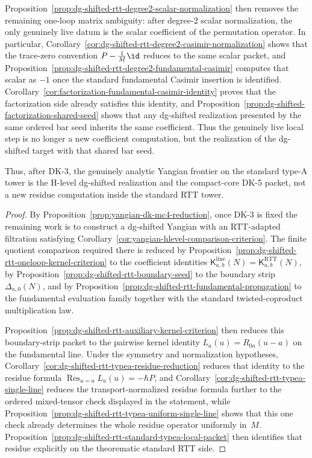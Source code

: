 \begin{proposition}
Proposition~\ref{prop:dg-shifted-rtt-degree2-scalar-normalization}
then removes the remaining one-loop matrix ambiguity: after
degree-$2$ scalar normalization, the only genuinely live datum is the
scalar coefficient of the permutation operator.  In particular,
Corollary~\ref{cor:dg-shifted-rtt-degree2-casimir-normalization}
shows that the trace-zero convention
$P-\frac{1}{M}\id$ reduces to the same scalar packet, and
Proposition~\ref{prop:dg-shifted-rtt-degree2-fundamental-casimir}
computes that scalar as $-1$ once the standard fundamental Casimir
insertion is identified.
Corollary~\ref{cor:factorization-fundamental-casimir-identity} proves
that the factorization side already satisfies this identity, and
Proposition~\ref{prop:dg-shifted-factorization-shared-seed} shows that
any dg-shifted realization presented by the same ordered bar seed
inherits the same coefficient.  Thus the genuinely live local step is
no longer a new coefficient computation, but the realization of the
dg-shifted target with that shared bar seed.

Thus, after DK-3, the genuinely analytic Yangian frontier on the
standard type-A tower is the H-level dg-shifted realization and the
compact-core DK-5 packet, not a new residue computation inside the
standard RTT tower.
\end{proposition}

\begin{proof}
By Proposition~\ref{prop:yangian-dk-mc4-reduction}, once DK-3 is fixed
the remaining work is to construct a dg-shifted Yangian with an
RTT-adapted filtration satisfying
Corollary~\ref{cor:yangian-hlevel-comparison-criterion}.  The finite
quotient comparison required there is reduced by
Proposition~\ref{prop:dg-shifted-rtt-oneloop-kernel-criterion} to the
coefficient identities
$\mathsf{K}^{\mathrm{line}}_{a,b}(N)
=\mathsf{K}^{\mathrm{RTT}}_{a,b}(N)$,
by Proposition~\ref{prop:dg-shifted-rtt-boundary-seed} to the boundary
strip $\Delta_{a,0}(N)$, and by
Proposition~\ref{prop:dg-shifted-rtt-fundamental-propagation} to the
fundamental evaluation family together with the standard
twisted-coproduct multiplication law.

Proposition~\ref{prop:dg-shifted-rtt-auxiliary-kernel-criterion} then
reduces this boundary-strip packet to the pairwise kernel identity
$L_a(u)=R_{0a}(u-a)$ on the fundamental line.  Under the symmetry and
normalization hypotheses,
Corollary~\ref{cor:dg-shifted-rtt-typea-residue-reduction} reduces that
identity to the residue formula
$\operatorname*{Res}_{u=a}L_a(u)=-\hbar P$, and
Corollary~\ref{cor:dg-shifted-rtt-typea-single-line} reduces the
transport-normalized residue formula further to the ordered
mixed-tensor check displayed in
the statement, while
Proposition~\ref{prop:dg-shifted-rtt-typea-uniform-single-line}
shows that this one check already determines the whole residue
operator uniformly in~$M$.  Proposition~\ref{prop:dg-shifted-rtt-standard-typea-local-packet}
then identifies that residue explicitly on the theorematic standard
RTT side.
\end{proof}

